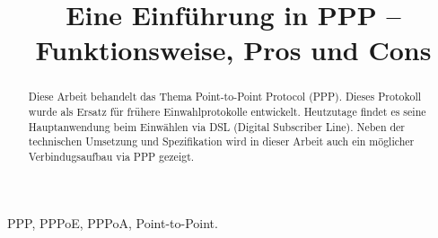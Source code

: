 \documentclass[journal,11pt]{IEEEtran}
\begin{document}
 
\title{Eine Einführung in PPP -- \\Funktionsweise, Pros und Cons}
\author{
 }
\maketitle 
\begin{abstract} 
Diese Arbeit behandelt das Thema Point-to-Point Protocol (PPP). Dieses Protokoll wurde als Ersatz f\"ur fr\"uhere Einwahlprotokolle entwickelt. Heutzutage findet es seine Hauptanwendung beim Einw\"ahlen via DSL (Digital Subscriber Line). Neben der technischen Umsetzung und Spezifikation wird in dieser Arbeit auch ein m\"oglicher Verbindugsaufbau via PPP gezeigt.
\end{abstract} 
\begin{IEEEkeywords} 
PPP, PPPoE, PPPoA, Point-to-Point.
\end{IEEEkeywords}
\end{document}
